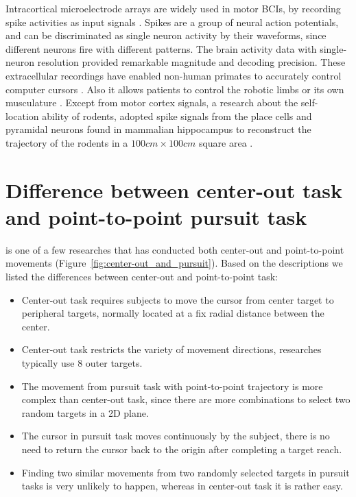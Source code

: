 Intracortical microelectrode arrays are widely used in motor BCIs,
by recording spike activities as input signals \citep{stavisky2015high}. 
Spikes are a group of neural action potentials, 
and can be discriminated as single neuron activity by their waveforms, 
since different neurons fire with different patterns. 
The brain activity data with single-neuron resolution provided remarkable magnitude and decoding precision.
These extracellular recordings have enabled non-human primates to accurately control computer cursors \citep{serruya2002instant, makin2018}.
Also it allows patients to control the robotic limbs \citep{carmena2003learning} or its own musculature \citep{ethier2012restoration}. 
Except from motor cortex signals, 
a research about the self-location ability of rodents, 
adopted spike signals from the place cells and pyramidal neurons found in mammalian hippocampus to reconstruct the trajectory of the rodents in a $ 100cm \times 100cm $ square area \citep{tampuu2019efficient}.



\section{Difference between center-out task and point-to-point pursuit task}
\label{sec:difference_between_center_out_and_pursuit}


\cite{li2016improved} is one of a few researches that has conducted both center-out and point-to-point movements (Figure~\ref{fig:center-out_and_pursuit}).
Based on the descriptions we listed the differences between center-out and point-to-point task:
\begin{itemize}
    \item Center-out task requires subjects to move the cursor from center target to peripheral targets, normally located at a fix radial distance between the center.
    \item Center-out task restricts the variety of movement directions, researches typically use 8 outer targets.
    \item The movement from pursuit task with point-to-point trajectory is more complex than center-out task, since there are more combinations to select two random targets in a 2D plane.
    \item The cursor in pursuit task moves continuously by the subject, there is no need to return the cursor back to the origin after completing a target reach.
    \item Finding two similar movements from two randomly selected targets in pursuit tasks is very unlikely to happen, whereas in center-out task it is rather easy.
\end{itemize}

